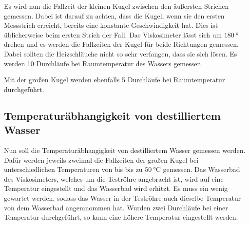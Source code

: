 Es wird nun die Fallzeit der kleinen Kugel zwischen den äußersten Strichen gemessen. Dabei ist darauf zu achten, dass die Kugel,
wenn sie den ersten Messstrich erreicht, bereits eine konstante Geschwindigkeit hat. Dies ist üblicherweise beim ersten Strich der Fall.
Das Viskosimeter lässt sich um $\SI{180}{\degree}$ drehen und es werden die Fallzeiten der Kugel für beide Richtungen gemessen. Dabei
sollten die Heizschläuche nicht so sehr verfangen, dass sie sich lösen.
Es werden 10 Durchläufe bei Raumtemperatur des Wassers gemessen.

Mit der großen Kugel werden ebenfalls 5 Durchläufe bei Raumtemperatur durchgeführt.

\subsection{Temperaturäbhangigkeit von destilliertem Wasser}
\label{subsec:tempAbh}

Nun soll die Temperaturäbhangigkeit von destilliertem Wasser gemessen werden. Dafür werden jeweils zweimal die Fallzeiten der großen Kugel bei
unterschiedlichen Temperaturen von bis bis zu $\SI{50}{\celsius}$ gemessen. 
Das Wasserbad des Viskosimeters, welches um die Teströhre angebracht ist, wird auf eine Temperatur eingestellt und das Wasserbad wird erhitzt.
Es muss ein wenig gewartet werden, sodass das Wasser in der Teströhre auch dieselbe Temperatur von dem Wasserbad angemnommen hat.
Wurden zwei Durchläufe bei einer Temperatur durchgeführt, so kann eine höhere Temperatur eingestellt werden.